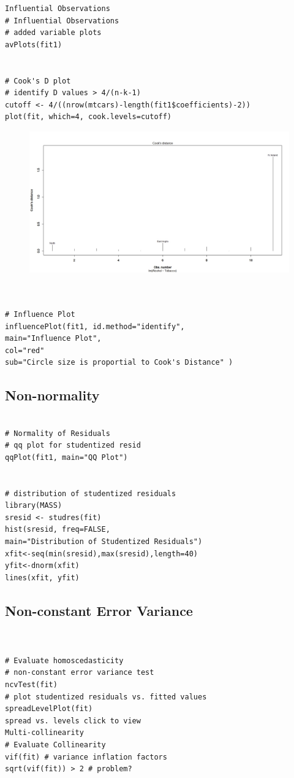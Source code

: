 \documentclass[residuals.tex]{subfiles}
\begin{document}
\begin{framed}
	\begin{verbatim}
Influential Observations
# Influential Observations
# added variable plots 
avPlots(fit1)


# Cook's D plot
# identify D values > 4/(n-k-1) 
cutoff <- 4/((nrow(mtcars)-length(fit1$coefficients)-2)) 
plot(fit, which=4, cook.levels=cutoff)
 \end{verbatim}
\end{framed}
\begin{figure}
\centering
\includegraphics[width=0.7\linewidth]{alcotob6}
\caption{}
\label{fig:alcotob6}
\end{figure}

\begin{framed}
	\begin{verbatim}


# Influence Plot 
influencePlot(fit1,	id.method="identify", 
main="Influence Plot", 
col="red"
sub="Circle size is proportial to Cook's Distance" )

\end{verbatim}
\end{framed}
\subsection*{Non-normality}

\begin{framed}
\begin{verbatim}

# Normality of Residuals
# qq plot for studentized resid
qqPlot(fit1, main="QQ Plot")


# distribution of studentized residuals
library(MASS)
sresid <- studres(fit) 
hist(sresid, freq=FALSE, 
main="Distribution of Studentized Residuals")
xfit<-seq(min(sresid),max(sresid),length=40) 
yfit<-dnorm(xfit) 
lines(xfit, yfit)
\end{verbatim}
\end{framed}
\subsection*{Non-constant Error Variance}
\begin{framed}
\begin{verbatim}	


# Evaluate homoscedasticity
# non-constant error variance test
ncvTest(fit)
# plot studentized residuals vs. fitted values 
spreadLevelPlot(fit)
spread vs. levels click to view
Multi-collinearity
# Evaluate Collinearity
vif(fit) # variance inflation factors 
sqrt(vif(fit)) > 2 # problem?
\end{verbatim}
\end{framed}
\end{document}

